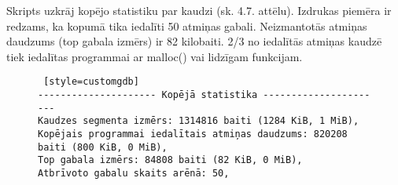 Skripts uzkrāj kopējo statistiku par kaudzi (sk. 4.7. attēlu). Izdrukas piemēra  ir redzams, ka kopumā tika iedalīti 50 atmiņas gabali.
Neizmantotās atmiņas daudzums (top gabala izmērs) ir 82 kilobaiti.
2/3 no iedalītās atmiņas kaudzē tiek iedalītas programmai ar malloc() vai lidzīgam funkcijam.

\begin{figure}[h]
\begin{lstlisting} [style=customgdb]
--------------------- Kopējā statistika ----------------------
Kaudzes segmenta izmērs: 1314816 baiti (1284 KiB, 1 MiB),
Kopējais programmai iedalītais atmiņas daudzums: 820208 baiti (800 KiB, 0 MiB),
Top gabala izmērs: 84808 baiti (82 KiB, 0 MiB),
Atbrīvoto gabalu skaits arēnā: 50,
\end{lstlisting}
\caption{\textbf{\fontsize{11}{12}\selectfont {Kopējā statistika}}}
\end{figure}




